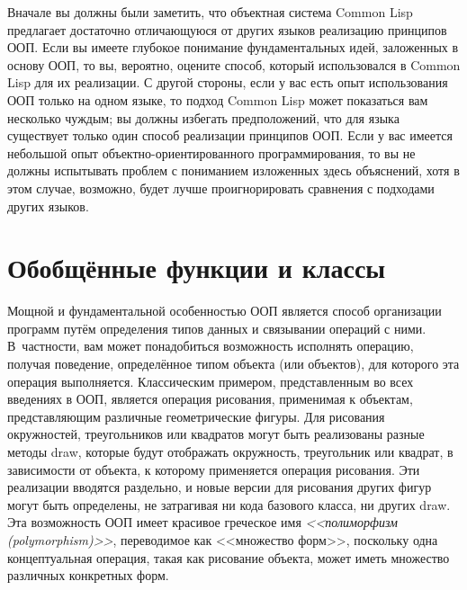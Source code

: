 Вначале вы должны были заметить, что объектная система Common Lisp предлагает достаточно
отличающуюся от других языков реализацию принципов ООП. Если вы имеете глубокое понимание
фундаментальных идей, заложенных в основу ООП, то вы, вероятно, оцените способ, который
использовался в Common Lisp для их реализации.  С другой стороны, если у вас есть опыт
использования ООП только на одном языке, то подход Common Lisp может показаться вам
несколько чуждым; вы должны избегать предположений, что для языка существует только один
способ реализации принципов ООП.  Если у вас имеется небольшой опыт
объектно-ориентированного программирования, то вы не должны испытывать проблем с
пониманием изложенных здесь объяснений, хотя в этом случае, возможно, будет лучше
проигнорировать сравнения с подходами других языков.

\section{Обобщённые функции и классы}

Мощной и фундаментальной особенностью ООП является способ организации программ путём
определения типов данных и связывании операций с ними.  В~частности, вам может
понадобиться возможность исполнять операцию, получая поведение, определённое типом объекта
(или объектов), для которого эта операция выполняется. Классическим примером, представленным
во всех введениях в ООП, является операция рисования, применимая к объектам,
представляющим различные геометрические фигуры.  Для рисования окружностей, треугольников
или квадратов могут быть реализованы разные методы draw, которые будут отображать
окружность, треугольник или квадрат, в зависимости от объекта, к которому применяется
операция рисования. Эти реализации вводятся раздельно, и новые версии для рисования других
фигур могут быть определены, не затрагивая ни кода базового класса, ни других draw.  Эта
возможность ООП имеет красивое греческое имя \textit{<<полиморфизм (polymorphism)>>},
переводимое как <<множество форм>>, поскольку одна концептуальная операция, такая как
рисование объекта, может иметь множество различных конкретных форм.

